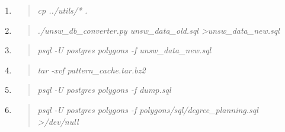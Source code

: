 \documentclass[12pt]{article}
\newenvironment{command}
   { 
      \begin{quote}\itshape
      \color{blue}
   }
   { \end{quote} }
\begin{document}
\begin{enumerate}
   \item \begin{command} cp ../utils/* . \end{command}
   \item \begin{command} ./unsw\_db\_converter.py unsw\_data\_old.sql
                         \textgreater unsw\_data\_new.sql\end{command}
   \item \begin{command} psql -U postgres polygons -f unsw\_data\_new.sql \end{command}
   \item \begin{command} tar -xvf pattern\_cache.tar.bz2 \end{command}
   \item \begin{command} psql -U postgres polygons -f dump.sql \end{command}
   \item \begin{command} psql -U postgres polygons -f polygons/sql/degree\_planning.sql >/dev/null \end{command}
\end{enumerate}
\end{document}
